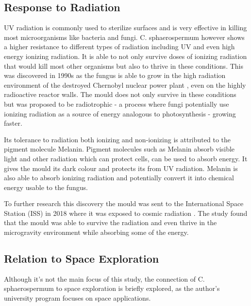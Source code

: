 \subsection{Response to Radiation}
\label{sec:radiation}
UV radiation is commonly used to sterilize surfaces and is very effective in killing most microorganisms like bacteria and fungi. C. sphaerospermum however shows a higher resistance to different types of radiation including UV and even high energy ionizing radiation.  
It is able to not only survive doses of ionizing radiation that would kill most other organisms but also to thrive in these conditions. This was discovered in 1990s as the fungus is able to grow in the high radiation environment of the destroyed Chernobyl nuclear power plant \cite{radiation}, even on the highly radioactive reactor walls. The mould does not only survive in these conditions but was proposed to be radiotrophic - a process where fungi potentially use ionizing radiation as a source of energy analogous to photosynthesis - growing faster.

Its tolerance to radiation both ionizing and non-ionizing is attributed to the pigment molecule Melanin. Pigment molecules such as Melanin absorb visible light and other radiation which can protect cells, can be used to absorb energy. It gives the mould its dark colour and protects its from UV radiation. Melanin is also able to absorb ionizing radiation and potentially convert it into chemical energy usable to the fungus.

To further research this discovery the mould was sent to the International Space Station (ISS) in 2018 where it was exposed to cosmic radiation \cite{iss}. The study found that the mould was able to survive the radiation and even thrive in the microgravity environment while absorbing some of the energy. 

\subsection{Relation to Space Exploration}
Although it's not the main focus of this study, the connection of C. sphaerospermum to space exploration is briefly explored, as the author's university program focuses on space applications.

